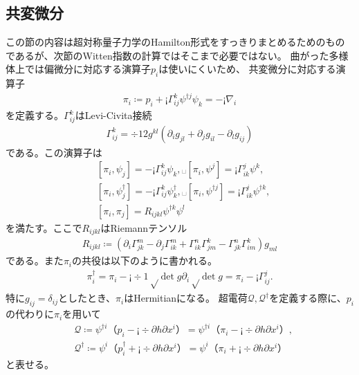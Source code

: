 \documentclass[12pt]{ltjsarticle}
\begin{document}
\subsection*{共変微分}
この節の内容は超対称量子力学のHamilton形式をすっきりまとめるためのものであるが、次節のWitten指数の計算ではそこまで必要ではない。
曲がった多様体上では偏微分に対応する演算子$p_i$は使いにくいため、
共変微分に対応する演算子
\begin{align}
    π_i ≔ p_i + ¡ Γ_{ij}^k ψ^{†j}ψ_k = -¡∇_i
\end{align}
を定義する。$Γ_{ij}^k$はLevi-Civita接続
\begin{align}
    Γ_{ij}^k = ÷1{2} g^{kl}(∂_ig_{jl}+∂_jg_{il}-∂_lg_{ij})
\end{align}
である。この演算子は
\begin{align}&
    [π_i, ψ_j] = -¡Γ_{ij}^kψ_k,␣
    [π_i, ψ^j] = ¡Γ_{ik}^jψ^k, \\
    &
    [π_i, ψ^†_j] = -¡Γ_{ij}^kψ^†_k, ␣
    [π_i, ψ^{†j}] = ¡Γ_{ik}^jψ^{†k}, \\
    &
    [π_i, π_j] = R_{ijkl}ψ^{†k}ψ^l
\end{align}
を満たす。ここで$R_{ijkl}$はRiemannテンソル
\begin{align}
    R_{ijkl} ≔ (∂_iΓ_{jk}^m-∂_jΓ_{ik}^m+Γ_{ik}^nΓ_{jm}^k - Γ_{jk}^nΓ_{im}^k) g_{ml}
\end{align}
である。また$π_i$の共役は以下のように書かれる。
\begin{align}
    π_i^† = π_i - ¡÷1{√{\det g}}∂_i√{\det g} = π_i - ¡Γ_{ij}^j.
\end{align}
特に$g_{ij} = δ_{ij}$としたとき、$π_i$はHermitianになる。
超電荷$𝒬, 𝒬^†$を定義する際に、$p_i$の代わりに$π_i$を用いて
\begin{align}&
    𝒬 ≔ ψ^{†i}（p_i - ¡÷{∂h}{∂x^i}）= ψ^{†i}（π_i - ¡÷{∂h}{∂x^i}）, \\
    &
    𝒬^† ≔ ψ^i（p^†_i + ¡÷{∂h}{∂x^i}）= ψ^i（π_i + ¡÷{∂h}{∂x^i}）
\end{align}
と表せる。
\end{document}
